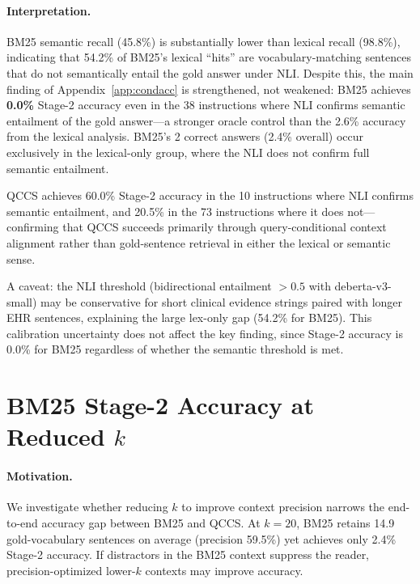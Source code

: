 \documentclass{article}
\begin{document}
\paragraph{Interpretation.}
BM25 semantic recall (45.8\%) is substantially lower than lexical recall (98.8\%),
indicating that 54.2\% of BM25's lexical ``hits'' are vocabulary-matching sentences
that do not semantically entail the gold answer under NLI. Despite this, the
main finding of Appendix~\ref{app:condacc} is strengthened, not weakened:
BM25 achieves \textbf{0.0\%} Stage-2 accuracy even in the 38 instructions where
NLI confirms semantic entailment of the gold answer---a stronger oracle control
than the 2.6\% accuracy from the lexical analysis. BM25's 2 correct answers
(2.4\% overall) occur exclusively in the lexical-only group, where the NLI
does not confirm full semantic entailment.

QCCS achieves 60.0\% Stage-2 accuracy in the 10 instructions where NLI confirms
semantic entailment, and 20.5\% in the 73 instructions where it does not---confirming
that QCCS succeeds primarily through query-conditional context alignment rather
than gold-sentence retrieval in either the lexical or semantic sense.

A caveat: the NLI threshold (bidirectional entailment $>0.5$ with deberta-v3-small)
may be conservative for short clinical evidence strings paired with longer EHR
sentences, explaining the large lex-only gap (54.2\% for BM25). This calibration
uncertainty does not affect the key finding, since Stage-2 accuracy is 0.0\% for
BM25 regardless of whether the semantic threshold is met.


\section{BM25 Stage-2 Accuracy at Reduced $k$}
\label{app:ksweep}

\paragraph{Motivation.}
We investigate whether reducing $k$ to improve context precision narrows the
end-to-end accuracy gap between BM25 and QCCS.
At $k{=}20$, BM25 retains 14.9 gold-vocabulary sentences on average (precision 59.5\%)
yet achieves only 2.4\% Stage-2 accuracy. If distractors in the BM25 context
suppress the reader, precision-optimized lower-$k$ contexts may improve accuracy.
\end{document}
